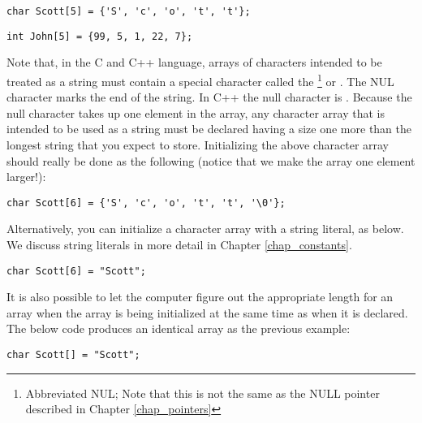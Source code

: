 \noindent\begin{minipage}{\linewidth}\begin{lstlisting}
char Scott[5] = {'S', 'c', 'o', 't', 't'};	
\end{lstlisting}\end{minipage}

\noindent\begin{minipage}{\linewidth}\begin{lstlisting}
int John[5] = {99, 5, 1, 22, 7};
\end{lstlisting}\end{minipage}
	
Note that, in the C and C++ language, arrays of characters intended to be treated as a string must contain a special character called the \footnote{Abbreviated NUL; Note that this is not the same as the NULL pointer described in Chapter \ref{chap_pointers}} or . 
The NUL character marks the end of the string. 
In C++ the null character is . 
Because the null character takes up one element in the array, any character array that is intended to be used as a string must be declared having a size one more than the longest string that you expect to store. 
Initializing the above character array should really be done as the following (notice that we make the array one element larger!):

\noindent\begin{minipage}{\linewidth}\begin{lstlisting}
char Scott[6] = {'S', 'c', 'o', 't', 't', '\0'};	
\end{lstlisting}\end{minipage}

Alternatively, you can initialize a character array with a string literal, as below. 
We discuss string literals in more detail in Chapter \ref{chap_constants}.

\noindent\begin{minipage}{\linewidth}\begin{lstlisting}
char Scott[6] = "Scott";	
\end{lstlisting}\end{minipage}

It is also possible to let the computer figure out the appropriate length for an array when the array is being initialized at the same time as when it is declared. 
The below code produces an identical array as the previous example:

\noindent\begin{minipage}{\linewidth}\begin{lstlisting}
char Scott[] = "Scott";	
\end{lstlisting}\end{minipage}

